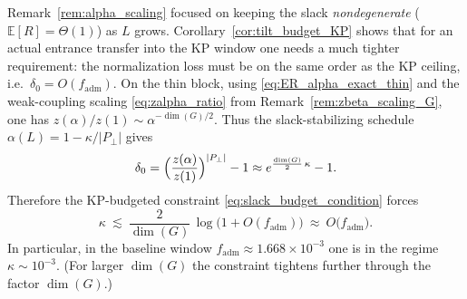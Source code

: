 \begin{remark}\label{rem:kappa_budgeted}
Remark~\ref{rem:alpha_scaling} focused on keeping the slack \emph{nondegenerate} ($\mathbb E[R]=\Theta(1)$) as $L$ grows.
Corollary~\ref{cor:tilt_budget_KP} shows that for an actual entrance transfer into the KP window one needs a much tighter requirement:
the normalization loss must be on the same order as the KP ceiling, i.e.\ $\delta_0=O(f_{\mathrm{adm}})$.
On the thin block, using \eqref{eq:ER_alpha_exact_thin} and the weak-coupling scaling
\eqref{eq:zalpha_ratio} from Remark~\ref{rem:zbeta_scaling_G}, one has
$z(\alpha)/z(1)\sim \alpha^{-\dim(G)/2}$.
Thus the slack-stabilizing schedule $\alpha(L)=1-\kappa/|P_\perp|$ gives
\[
\delta_0
=
\Bigl(\frac{z(\alpha)}{z(1)}\Bigr)^{|P_\perp|}-1
\approx
e^{\frac{\dim(G)}{2}\,\kappa}-1.
\]
Therefore the KP-budgeted constraint \eqref{eq:slack_budget_condition} forces
\begin{equation}\label{eq:kappa_budget}
\kappa\ \lesssim\ \frac{2}{\dim(G)}\,\log\bigl(1+O(f_{\mathrm{adm}})\bigr)\ \approx\ O\bigl(f_{\mathrm{adm}}\bigr).
\end{equation}
In particular, in the baseline window $f_{\mathrm{adm}}\approx 1.668\times 10^{-3}$ one is in the regime $\kappa\sim 10^{-3}$.
(For larger $\dim(G)$ the constraint tightens further through the factor $\dim(G)$.)
\end{remark}








